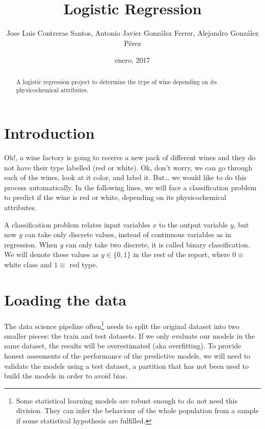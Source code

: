 \documentclass[12pt,]{article}
\title{Logistic Regression}
\author{Jose Luis Contreras Santos, Antonio Javier González Ferrer, Alejandro
González Pérez}
\date{enero, 2017}
\let\rmarkdownfootnote\footnote%
\def\footnote{\protect\rmarkdownfootnote}
\begin{document}
\maketitle
\begin{abstract}
A logistic regression project to determine the type of wine depending on
its physicochemical attributes.
\end{abstract}

\section{Introduction}\label{introduction}

Oh!, a wine factory is going to receive a new pack of different wines
and they do not have their type labelled (red or white). Ok, don't
worry, we can go through each of the wines, look at it color, and label
it. But\ldots{} we would like to do this process automatically. In the
following lines, we will face a classification problem to predict if the
wine is red or white, depending on its physicochemical attributes.

A classification problem relates input variables \(x\) to the output
variable \(y\), but now \(y\) can take only discrete values, instead of
continuous variables as in regression. When \(y\) can only take two
discrete, it is called binary classification. We will denote these
values as \(y \in \{0, 1\}\) in the rest of the report, where
\(0 \equiv\) white class and \(1 \equiv\) red type.

\section{Loading the data}\label{loading-the-data}

The data science pipeline often\footnote{Some statistical learning
  models are robust enough to do not need this division. They can infer
  the behaviour of the whole population from a sample if some
  statistical hypothesis are fulfilled.} needs to split the original
dataset into two smaller pieces: the train and test datasets. If we only
evaluate our models in the same dataset, the results will be
overestimated (aka overfitting). To provide honest assesments of the
performance of the predictive models, we will need to validate the
models using a test dataset, a partition that has not been used to build
the models in order to avoid bias.
\end{document}
